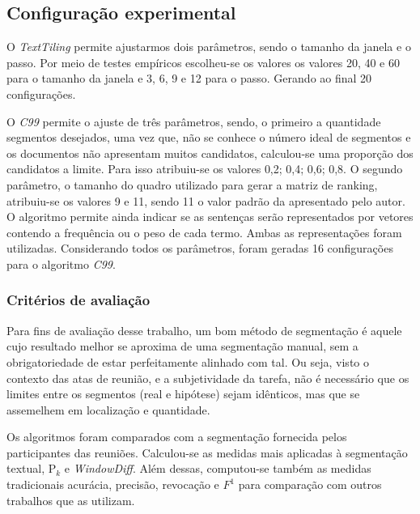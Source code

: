 \subsection{Configuração experimental}
	\label{subsec:configuracaoexperimental}

%
O \textit{TextTiling} permite ajustarmos dois parâmetros, sendo o tamanho da janela e o passo. Por meio de testes empíricos escolheu-se os valores os valores 20, 40 e 60 para o tamanho da janela e 3, 6, 9 e 12 para o passo. Gerando ao final 20 configurações.
%

O \textit{C99} permite o ajuste de três parâmetros, sendo, o primeiro a quantidade segmentos desejados, uma vez que, não se conhece o número ideal de segmentos e os documentos não apresentam muitos candidatos, calculou-se uma proporção dos candidatos a limite. Para isso atribuiu-se os valores {0,2; 0,4; 0,6; 0,8}. O segundo parâmetro, o tamanho do quadro utilizado para gerar a matriz de ranking, atribuiu-se os valores 9 e 11, sendo 11 o valor padrão da apresentado pelo autor. O algoritmo permite ainda indicar se as sentenças serão representados por vetores contendo a frequência ou o peso de cada termo. Ambas as representações foram utilizadas. Considerando todos os parâmetros, foram geradas 16 configurações para o algoritmo \textit{C99}.





\subsubsection{Critérios de avaliação}

Para fins de avaliação desse trabalho, um bom método de segmentação é aquele cujo resultado melhor se aproxima de uma segmentação manual, sem a obrigatoriedade de estar perfeitamente alinhado com tal. Ou seja, visto o contexto das atas de reunião, e a subjetividade da tarefa, não é necessário que os limites entre os segmentos (real e hipótese) sejam idênticos, mas que se assemelhem em localização e quantidade.


Os algoritmos foram comparados com a segmentação fornecida pelos participantes das reuniões. Calculou-se as medidas mais aplicadas à segmentação textual, P$_k$ e \textit{WindowDiff}. Além dessas, computou-se também as medidas tradicionais acurácia, precisão, revocação e $F^1$ para comparação com outros trabalhos que as utilizam.

